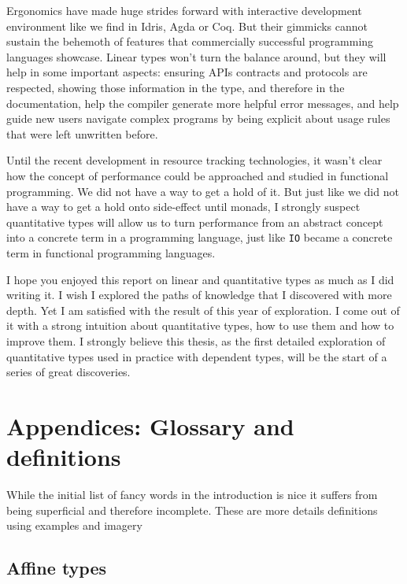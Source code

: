 \documentclass[
]{article}
\begin{document}
Ergonomics have made huge strides forward with interactive development
environment like we find in Idris, Agda or Coq. But their gimmicks
cannot sustain the behemoth of features that commercially successful
programming languages showcase. Linear types won't turn the balance
around, but they will help in some important aspects: ensuring APIs
contracts and protocols are respected, showing those information in the
type, and therefore in the documentation, help the compiler generate
more helpful error messages, and help guide new users navigate complex
programs by being explicit about usage rules that were left unwritten
before.

Until the recent development in resource tracking technologies, it
wasn't clear how the concept of performance could be approached and
studied in functional programming. We did not have a way to get a hold
of it. But just like we did not have a way to get a hold onto
side-effect until monads, I strongly suspect quantitative types will
allow us to turn performance from an abstract concept into a concrete
term in a programming language, just like \texttt{IO} became a concrete
term in functional programming languages.

I hope you enjoyed this report on linear and quantitative types as much
as I did writing it. I wish I explored the paths of knowledge that I
discovered with more depth. Yet I am satisfied with the result of this
year of exploration. I come out of it with a strong intuition about
quantitative types, how to use them and how to improve them. I strongly
believe this thesis, as the first detailed exploration of quantitative
types used in practice with dependent types, will be the start of a
series of great discoveries.

\newpage

\hypertarget{appendices-glossary-and-definitions}{%
\section{Appendices: Glossary and
definitions}\label{appendices-glossary-and-definitions}}

While the initial list of fancy words in the introduction is nice it
suffers from being superficial and therefore incomplete. These are more
details definitions using examples and imagery

\hypertarget{affine-types}{%
\subsection{Affine types}\label{affine-types}}
\end{document}

